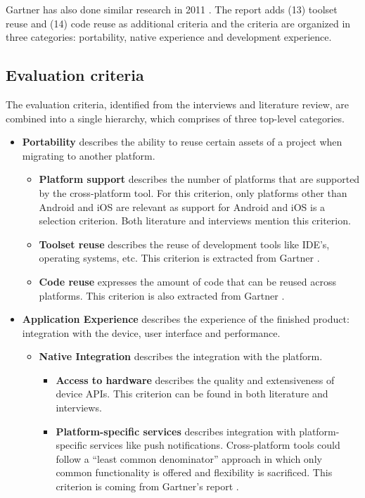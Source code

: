 Gartner has also done similar research in 2011 \cite{Gartner:CPT:2011}. The report adds (13) toolset reuse and (14) code reuse as additional criteria and the criteria are organized in three categories: portability, native experience and development experience.

\subsection{Evaluation criteria}

The evaluation criteria, identified from the interviews and literature review, are combined into a single hierarchy, which comprises of three top-level categories.

\begin{itemize}
    \item \textbf{Portability} describes the ability to reuse certain assets of a project when migrating to another platform.
    \begin{itemize}
        \item \textbf{Platform support} describes the number of platforms that are supported by the cross-platform tool. For this criterion, only platforms other than Android and iOS are relevant as support for Android and iOS is a selection criterion. Both literature \cite{Gartner:CPT:2011, VMCPT:2012} and interviews mention this criterion.
        \item \textbf{Toolset reuse} describes the reuse of development tools like IDE's, operating systems, etc. This criterion is extracted from Gartner \cite{Gartner:CPT:2011}.
        \item \textbf{Code reuse} expresses the amount of code that can be reused across platforms. This criterion is also extracted from Gartner \cite{Gartner:CPT:2011}.
    \end{itemize}
    \item \textbf{Application Experience} describes the experience of the finished product: integration with the device, user interface and performance. 
    \begin{itemize}
        \item \textbf{Native Integration} describes the integration with the platform.
        \begin{itemize}
            \item \textbf{Access to hardware} describes the quality and extensiveness of device APIs. This criterion can be found in both literature and interviews.
            \item \textbf{Platform-specific services} describes integration with platform-specific services like push notifications. Cross-platform tools could follow a ``least common denominator'' approach in which only common functionality is offered and flexibility is sacrificed. This criterion is coming from Gartner's report \cite{Gartner:CPT:2011}.

\end{itemize}
\end{itemize}
\end{itemize}

